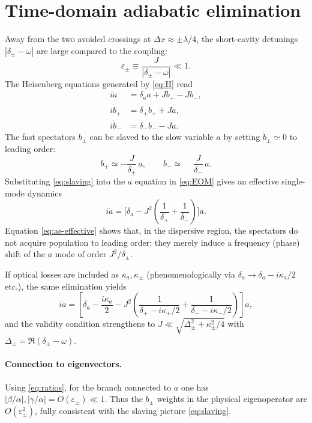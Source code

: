 \section*{Time-domain adiabatic elimination}
Away from the two avoided crossings at \(\Delta x\approx\pm \lambda/4\), the short-cavity detunings \(|\delta_\pm-\omega|\) are large compared to the coupling:
\begin{equation}
\varepsilon_\pm \equiv \frac{J}{|\delta_\pm-\omega|}\ll 1 .
\end{equation}
The Heisenberg equations generated by \eqref{eq:H} read
\begin{equation}
\label{eq:EOM}
\begin{aligned}
i\dot a &= \delta_a a + J b_+ - J b_-,\\
i\dot b_+ &= \delta_+ b_+ + J a,\\
i\dot b_- &= \delta_- b_- - J a.
\end{aligned}
\end{equation}
The fast spectators \(b_\pm\) can be slaved to the slow variable \(a\) by setting \(\dot b_\pm\simeq 0\) to leading order:
\begin{equation}
\label{eq:slaving}
b_+ \simeq -\frac{J}{\delta_+}\,a,\qquad
b_- \simeq \phantom{-}\frac{J}{\delta_-}\,a.
\end{equation}
Substituting \eqref{eq:slaving} into the \(a\) equation in \eqref{eq:EOM} gives an effective single-mode dynamics
\begin{equation}
\label{eq:ae-effective}
i\dot a = \Bigg[\delta_a - J^2\!\left(\frac{1}{\delta_+}+\frac{1}{\delta_-}\right)\Bigg] a .
\end{equation}
Equation \eqref{eq:ae-effective} shows that, in the dispersive region, the spectators do not acquire population to leading order; they merely induce a frequency (phase) shift of the \(a\) mode of order \(J^2/\delta_\pm\).

If optical losses are included as \(\kappa_a,\kappa_\pm\) (phenomenologically via \(\delta_a\to\delta_a-i\kappa_a/2\) etc.), the same elimination yields
\begin{equation}
\label{eq:ae-loss}
i\dot a = \left[\delta_a-\frac{i\kappa_a}{2} - J^2
\left(\frac{1}{\delta_+ - i\kappa_+/2}+\frac{1}{\delta_- - i\kappa_-/2}\right)\right] a,
\end{equation}
and the validity condition strengthens to \(J\ll \sqrt{\Delta_\pm^2+\kappa_\pm^2/4}\) with \(\Delta_\pm=\Re(\delta_\pm-\omega)\).

\paragraph{Connection to eigenvectors.}
Using \eqref{eq:ratios}, for the branch connected to \(a\) one has \(|\beta/\alpha|,|\gamma/\alpha|=O(\varepsilon_\pm)\ll1\). Thus the \(b_\pm\) weights in the physical eigenoperator are \(O(\varepsilon_\pm^2)\), fully consistent with the slaving picture \eqref{eq:slaving}.

